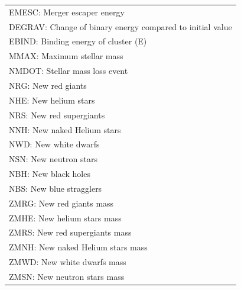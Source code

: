 \begin{longtable}{||p{0.42in}|p{0.25in}|p{0.6in}|p{0.6in}|p{0.4in}|p{2.3in}||}
\multicolumn{6}{|p{5.4in}|}{EMESC: Merger escaper energy}\\
\multicolumn{6}{|p{5.4in}|}{DEGRAV: Change of binary energy compared to initial value}\\
\multicolumn{6}{|p{5.4in}|}{EBIND: Binding energy of cluster (E)}\\
\multicolumn{6}{|p{5.4in}|}{MMAX:  Maximum stellar mass}\\
\multicolumn{6}{|p{5.4in}|}{NMDOT: Stellar mass loss event}\\
\multicolumn{6}{|p{5.4in}|}{NRG:   New red giants}\\
\multicolumn{6}{|p{5.4in}|}{NHE:   New helium stars}\\
\multicolumn{6}{|p{5.4in}|}{NRS:   New red supergiants}\\
\multicolumn{6}{|p{5.4in}|}{NNH:   New naked Helium stars}\\
\multicolumn{6}{|p{5.4in}|}{NWD:   New white dwarfs}\\
\multicolumn{6}{|p{5.4in}|}{NSN:   New neutron stars}\\
\multicolumn{6}{|p{5.4in}|}{NBH:   New black holes}\\
\multicolumn{6}{|p{5.4in}|}{NBS:   New blue stragglers}\\
\multicolumn{6}{|p{5.4in}|}{ZMRG:  New red giants mass}\\
\multicolumn{6}{|p{5.4in}|}{ZMHE:  New helium stars mass}\\
\multicolumn{6}{|p{5.4in}|}{ZMRS:  New red supergiants mass}\\
\multicolumn{6}{|p{5.4in}|}{ZMNH:  New naked Helium stars mass}\\
\multicolumn{6}{|p{5.4in}|}{ZMWD:  New white dwarfs mass}\\
\multicolumn{6}{|p{5.4in}|}{ZMSN:  New neutron stars mass}\\
\hline\hline


\end{longtable}

